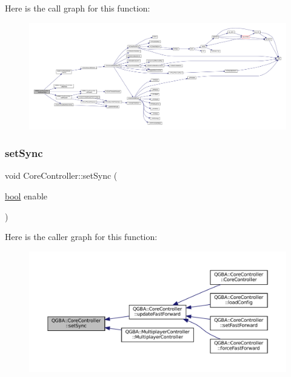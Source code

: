 Here is the call graph for this function\+:
\nopagebreak
\begin{figure}[H]
\begin{center}
\leavevmode
\includegraphics[width=350pt]{class_q_g_b_a_1_1_core_controller_a66b4d11936198f097b2004a2a64b4c02_cgraph}
\end{center}
\end{figure}
\mbox{\label{class_q_g_b_a_1_1_core_controller_ad46b3dd26bdfb022cfd29b1b946e727a}} 
\subsubsection{\texorpdfstring{set\+Sync}{setSync}}
{\footnotesize\ttfamily void Core\+Controller\+::set\+Sync (\begin{DoxyParamCaption}\item[{\mbox{\hyperlink{libretro_8h_a4a26dcae73fb7e1528214a068aca317e}{bool}}}]{enable }\end{DoxyParamCaption})\hspace{0.3cm}{\ttfamily [slot]}}

Here is the caller graph for this function\+:
\nopagebreak
\begin{figure}[H]
\begin{center}
\leavevmode
\includegraphics[width=350pt]{class_q_g_b_a_1_1_core_controller_ad46b3dd26bdfb022cfd29b1b946e727a_icgraph}
\end{center}
\end{figure}
\mbox{\label{class_q_g_b_a_1_1_core_controller_ab1fcc2b4218c46e5805f99c8196497cc}} 
